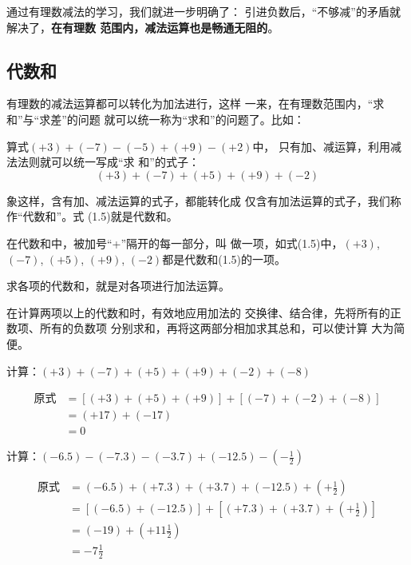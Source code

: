通过有理数减法的学习，我们就进一步明确了：
引进负数后，“不够减”的矛盾就解决了，\textbf{在有理数
范围内，减法运算也是畅通无阻的}。


\subsection{代数和}
    有理数的减法运算都可以转化为加法进行，这样
一来，在有理数范围内，“求和”与“求差”的问题
就可以统一称为“求和”的问题了。比如：

    算式$(+ 3)+(-7)-(-5)+(+9)-(+2)$中，
只有加、减运算，利用减法法则就可以统一写成“求
和”的式子：
\begin{equation}
    (+ 3)+(-7)+(+5)+(+9)+(-2)
\end{equation}

象这样，含有加、减法运算的式子，都能转化成
仅含有加法运算的式子，我们称作“代数和”。式
  (1.5)就是代数和。

    在代数和中，被加号“+”隔开的每一部分，叫
做一项，如式(1.5)中，$(+3)$, $(-7)$, $(+ 5)$,
  $(+9)$, $(-2)$都是代数和(1.5)的一项。

    求各项的代数和，就是对各项进行加法运算。

    在计算两项以上的代数和时，有效地应用加法的
交换律、结合律，先将所有的正数项、所有的负数项
分别求和，再将这两部分相加求其总和，可以使计算
大为简便。

\begin{example}
计算：$(+3)+(-7)+(+5)+(+9)+(-2)+(-8)$
\end{example}

\begin{solution}
\begin{align*}
    \text{原式}&= [(+3)+(+5)+(+9)]+[(-7)+(-2)+(-8)] \tag{交换、结合律}\\
    &=(+17)+(-17) \tag{同号加法法则}\\
    &=0 \tag{相反数的特性}
\end{align*}
\end{solution}

\begin{example}
    计算：$(-6.5)-(-7.3)-(-3.7)+(-12.5)-\left(-\frac{1}{2}\right)$
\end{example}

\begin{solution}
    \begin{align*}
    \text{原式}&= (-6.5)+(+7.3)+(+3.7)+(-12.5)+\left(+\frac{1}{2}\right) \tag{减法法则}\\
    &=[(-6.5)+(-12.5)]+\left[(+7.3)+(+3.7)+\left(+\frac{1}{2}\right)\right] \tag{交换、结合律}\\
    &=(-19)+\left(+11\frac{1}{2}\right) \tag{同号相加法则}\\
    &=-7\frac{1}{2} \tag{异号相加法则}
\end{align*}
\end{solution}

